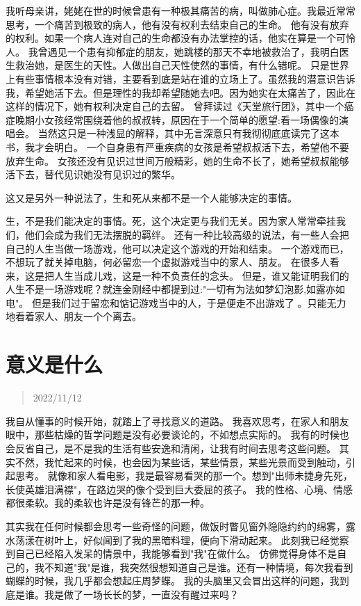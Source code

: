 \documentclass[cn,12pt]{elegantbook}
\begin{document}
我听母亲讲，姥姥在世的时候曾患有一种极其痛苦的病，叫做肺心症。我最近常常思考，一个痛苦到极致的病人，他有没有权利去结束自己的生命。
他有没有放弃的权利。如果一个病人连对自己的生命都没有办法掌控的话，他实在算是一个可怜人。
我曾遇见一个患有抑郁症的朋友，她跳楼的那天不幸地被救治了，我明白医生救治她，是医生的天性。人做出自己天性使然的事情，有什么错呢。
只是世界上有些事情根本没有对错，主要看到底是站在谁的立场上了。虽然我的潜意识告诉我，希望她活下去。但是理性的我却希望随她去吧。因为她实在太痛苦了，因此在这样的情况下，她有权利决定自己的去留。
曾拜读过《天堂旅行团》，其中一个癌症晚期小女孩经常围绕着他的叔叔转，原因在于一个简单的愿望:看一场偶像的演唱会。
当然这只是一种浅显的解释，其中无言深意只有我彻彻底底读完了这本书，我才会明白。
一个自身患有严重疾病的女孩是希望叔叔活下去，希望他不要放弃生命。
女孩还没有见识过世间万般精彩，她的生命不长了，她希望叔叔能够活下去，替代见识她没有见识过的繁华。

这又是另外一种说法了，生和死从来都不是一个人能够决定的事情。

生，不是我们能决定的事情。死，这个决定更与我们无关。因为家人常常牵挂我们，他们会成为我们无法摆脱的羁绊。
还有一种比较高级的说法，有一些人会把自己的人生当做一场游戏，他可以决定这个游戏的开始和结束。
一个游戏而已，不想玩了就关掉电脑，何必留恋一个虚拟游戏当中的家人、朋友。
在很多人看来，这是把人生当成儿戏，这是一种不负责任的念头。
但是，谁又能证明我们的人生不是一场游戏呢？就连金刚经中都提到过:"一切有为法如梦幻泡影,如露亦如电"。
但是我们过于留恋和惦记游戏当中的人，于是便走不出游戏了 。只能无力地看着家人、朋友一个个离去。

\newpage
\section{意义是什么}
\begin{quotation}
  2022/11/12
\end{quotation}

我自从懂事的时候开始，就踏上了寻找意义的道路。
我喜欢思考，在家人和朋友眼中，那些枯燥的哲学问题是没有必要谈论的，不如想点实际的。
我有的时候也会反省自己，是不是我的生活有些安逸和清闲，让我有时间去思考这些问题。
其实不然，我忙起来的时候，也会因为某些话，某些情景，某些光景而受到触动，引起思考。
就像和家人看电影，我是最容易看哭的那一个。想到"出师未捷身先死，长使英雄泪满襟"，在路边哭的像个受到巨大委屈的孩子。
我的性格、心境、情感都很柔软。我的柔软也许是没有锋芒的那一种。

其实我在任何时候都会思考一些奇怪的问题，做饭时瞥见窗外隐隐约约的绵雾，露水荡漾在树叶上，好似闻到了我的黑暗料理，便向下滑动起来。
此刻我已经觉察到自己已经陷入发呆的情景中，我能够看到"我"在做什么。
仿佛觉得身体不是自己的，我不知道"我"是谁，我突然很想知道自己是谁。还有一种情境，每次我看到蝴蝶的时候，我几乎都会想起庄周梦蝶。
我的头脑里又会冒出这样的问题，我到底是谁。我是做了一场长长的梦，一直没有醒过来吗？
\end{document}
